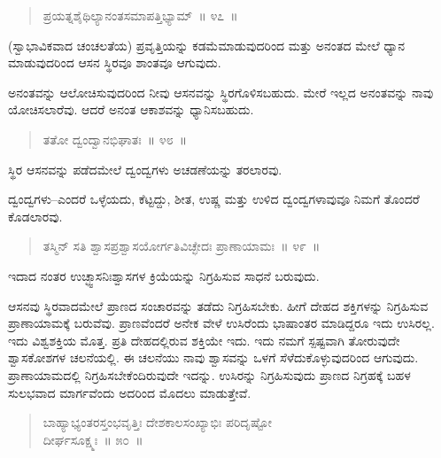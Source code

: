 \vspace{-0.3cm}

\begin{verse}
ಪ್ರಯತ್ನಶೈಥಿಲ್ಯಾನಂತಸಮಾಪತ್ತಿಭ್ಯಾಮ್​~॥ ೪೭~॥
\end{verse}

\vspace{-0.3cm}

(ಸ್ವಾಭಾವಿಕವಾದ ಚಂಚಲತೆಯ) ಪ್ರವೃತ್ತಿಯನ್ನು ಕಡಮೆಮಾಡುವುದರಿಂದ ಮತ್ತು ಅನಂತದ ಮೇಲೆ ಧ್ಯಾನ ಮಾಡುವುದರಿಂದ ಆಸನ ಸ್ಥಿರವೂ ಶಾಂತವೂ ಆಗುವುದು. 

ಅನಂತವನ್ನು ಆಲೋಚಿಸುವುದರಿಂದ ನೀವು ಆಸನವನ್ನು ಸ್ಥಿರಗೊಳಿಸಬಹುದು. ಮೇರೆ ಇಲ್ಲದ ಅನಂತವನ್ನು ನಾವು ಯೋಚಿಸಲಾರೆವು. ಆದರೆ ಅನಂತ ಆಕಾಶವನ್ನು ಧ್ಯಾನಿಸಬಹುದು. 

\vspace{-0.3cm}

\begin{verse}
ತತೋ ದ್ವಂದ್ವಾನಭಿಘಾತಃ~॥ ೪೮~॥
\end{verse}

\vspace{-0.3cm}

ಸ್ಥಿರ ಆಸನವನ್ನು ಪಡೆದಮೇಲೆ ದ್ವಂದ್ವಗಳು ಅಚಡಣೆಯನ್ನು ತರಲಾರವು. 

ದ್ವಂದ್ವಗಳು–ಎಂದರೆ ಒಳ್ಳೆಯದು, ಕೆಟ್ಟದ್ದು, ಶೀತ, ಉಷ್ಣ ಮತ್ತು ಉಳಿದ ದ್ವಂದ್ವಗಳಾವುವೂ ನಿಮಗೆ ತೊಂದರೆ ಕೊಡಲಾರವು. 

\vspace{-0.3cm}

\begin{verse}
ತಸ್ಮಿನ್​ ಸತಿ ಶ್ವಾಸಪ್ರಶ್ವಾಸಯೋರ್ಗತಿವಿಚ್ಛೇದಃ ಪ್ರಾಣಾಯಾಮಃ~॥ ೪೯~॥
\end{verse}

\vspace{-0.3cm}

ಇದಾದ ನಂತರ ಉಚ್ಛ್ವಾಸನಿಃಶ್ವಾಸಗಳ ಕ್ರಿಯೆಯನ್ನು ನಿಗ್ರಹಿಸುವ ಸಾಧನೆ ಬರುವುದು. 

ಆಸನವು ಸ್ಥಿರವಾದಮೇಲೆ ಪ್ರಾಣದ ಸಂಚಾರವನ್ನು ತಡೆದು ನಿಗ್ರಹಿಸಬೇಕು. ಹೀಗೆ ದೇಹದ ಶಕ್ತಿಗಳನ್ನು ನಿಗ್ರಹಿಸುವ ಪ್ರಾಣಾಯಾಮಕ್ಕೆ ಬರುವೆವು. ಪ್ರಾಣವೆಂದರೆ ಅನೇಕ ವೇಳೆ ಉಸಿರೆಂದು ಭಾಷಾಂತರ ಮಾಡಿದ್ದರೂ ಇದು ಉಸಿರಲ್ಲ. ಇದು ವಿಶ್ವಶಕ್ತಿಯ ಮೊತ್ತ. ಪ್ರತಿ ದೇಹದಲ್ಲಿರುವ ಶಕ್ತಿಯೇ ಇದು. ಇದು ನಮಗೆ ಸ್ಪಷ್ಟವಾಗಿ ತೋರುವುದೇ ಶ್ವಾಸಕೋಶಗಳ ಚಲನೆಯಲ್ಲಿ. ಈ ಚಲನೆಯು ನಾವು ಶ್ವಾಸವನ್ನು ಒಳಗೆ ಸೆಳೆದುಕೊಳ್ಳುವುದರಿಂದ ಆಗುವುದು. ಪ್ರಾಣಾಯಾಮದಲ್ಲಿ ನಿಗ್ರಹಿಸಬೇಕೆಂದಿರುವುದೇ ಇದನ್ನು. ಉಸಿರನ್ನು ನಿಗ್ರಹಿಸುವುದು ಪ್ರಾಣದ ನಿಗ್ರಹಕ್ಕೆ ಬಹಳ ಸುಲಭವಾದ ಮಾರ್ಗವೆಂದು ಅದರಿಂದ ಮೊದಲು ಮಾಡುತ್ತೇವೆ. 

\vspace{-0.3cm}

\begin{verse}
ಬಾಹ್ಯಾಭ್ಯಂತರಸ್ತಂಭವೃತ್ತಿಃ ದೇಶಕಾಲಸಂಖ್ಯಾಭಿಃ ಪರಿದೃಷ್ಟೋ\\ದೀರ್ಘಸೂಕ್ಷ್ಮಃ~॥ ೫೦~॥
\end{verse}

